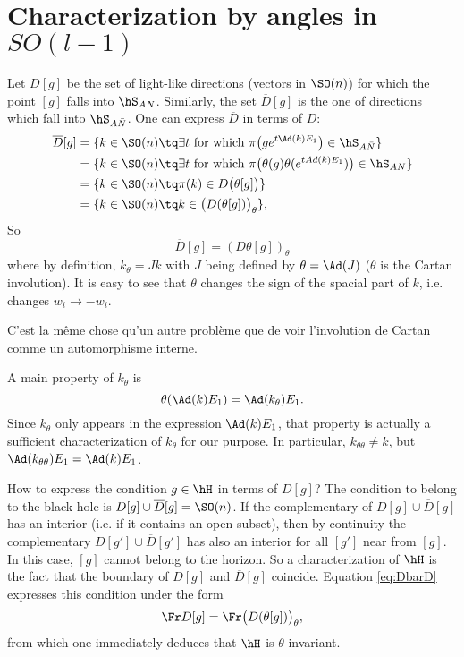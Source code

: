 
\section{Characterization by angles in \texorpdfstring{$SO(l-1)$}{SOl-1}}

Let $D[g]$ be the set of light-like directions (vectors in $\SO(n)$) for which the point $[g]$ falls into $\hS_{AN}$. Similarly, the set $\overline{D}[g]$ is the one of directions which fall into $\hS_{A \bar{N}}$. One can express $\overline{ D }$ in terms of $D$:
\[
	\begin{split}
		\overline{ D }[g]&=\{ k\in\SO(n)\tq\exists t\text{ for which }\pi\big( g e^{t\Ad(k)E_1} \big)\in\hS_{A\bar N} \}\\
		&=\{ k\in\SO(n)\tq\exists t\text{ for which }\pi\big( \theta(g)\theta( e^{tAd(k)E_1}) \big)\in\hS_{AN}\}\\
		&=\{ k\in\SO(n)\tq \pi(k)\in D\big( \theta[g] \big)\}\\
		&=\{ k\in\SO(n)\tq k\in\big( D(\theta[g]) \big)_{\theta}\},
	\end{split}
\]
So
\begin{equation} \label{eq:DbarD}
	\overline{D}[g]=(D\theta[g])_{\theta}
\end{equation}
where by definition, $k_{\theta}=Jk$ with $J$ being defined by $\theta=\Ad(J)$ ($\theta$ is the Cartan involution). It is easy to see that $\theta$ changes the sign of the spacial part of $k$, i.e. changes $w_i\to -w_i$.

\begin{probleme}
	C'est la même chose qu'un autre problème que de voir l'involution de Cartan comme un automorphisme interne.
	\label{propCrtadeux}
\end{probleme}

A main property of $k_{\theta}$ is
\[
	\theta(\Ad(k)E_1)=\Ad(k_{\theta})E_1.
\]
Since $k_{\theta}$ only appears in the expression $\Ad(k)E_1$, that property is actually a sufficient characterization of $k_{\theta}$ for our purpose. In particular, $k_{\theta\theta}\neq k$, but $\Ad(k_{\theta\theta})E_1=\Ad(k)E_1$.

How to express the condition $g\in\hH$ in terms of $D[g]$? The condition to belong to the black hole is $D[g]\cup \overline{D}[g]=\SO(n)$. If the complementary of $D[g]\cup \overline{D}[g]$ has an interior (i.e. if it contains an open subset), then by continuity the complementary $D[g']\cup \overline{D}[g']$ has also an interior for all $[g']$ near from $[g]$. In this case, $[g]$ cannot belong to the horizon. So a characterization of $\hH$ is the fact that the boundary of $D[g]$ and $\overline{D}[g]$ coincide. Equation \eqref{eq:DbarD} expresses this condition under the form
\begin{equation}
	\Fr D[g]=\Fr \big( D(\theta[g])\big)_{\theta},
\end{equation}
from which one immediately deduces that $\hH$ is $\theta$-invariant.

